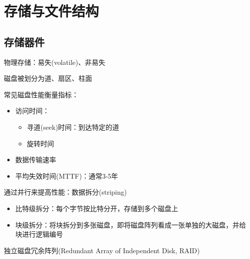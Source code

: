 
\section{存储与文件结构} %
\subsection{存储器件}
物理存储：易失(volatile)、非易失

磁盘被划分为道、扇区、柱面

常见磁盘性能衡量指标：
\begin{itemize}
	\item 访问时间：
	\begin{itemize}
		\item 寻道(seek)时间：到达特定的道
		\item 旋转时间
	\end{itemize}
	\item 数据传输速率
	\item 平均失效时间(MTTF)：通常3-5年
\end{itemize}

通过并行来提高性能：数据拆分(striping)
\begin{itemize}
	\item 比特级拆分：每个字节按比特分开，存储到多个磁盘上
	\item 块级拆分：将块拆分到多张磁盘，即将磁盘阵列看成一张单独的大磁盘，并给块进行逻辑编号
\end{itemize}

独立磁盘冗余阵列(Redundant Array of Independent Disk, RAID)

